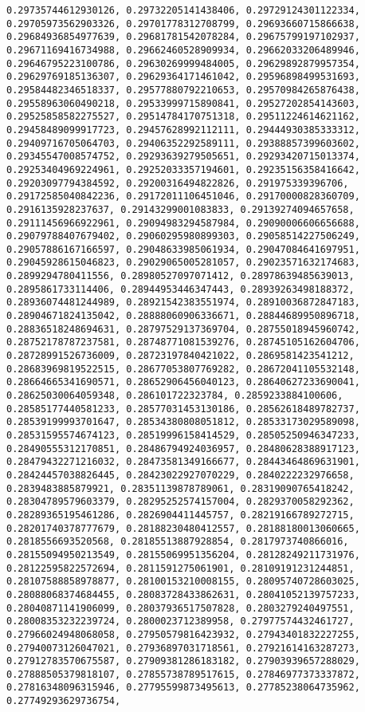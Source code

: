 \documentclass[11pt]{article}
\begin{document}
\begin{Verbatim}[commandchars=\\\{\}]
0.29735744612930126, 0.29732205141438406, 0.29729124301122334, 0.29705973562903326, 0.29701778312708799, 0.29693660715866638, 0.29684936854977639, 0.29681781542078284, 0.29675799197102937, 0.29671169416734988, 0.29662460528909934, 0.29662033206489946, 0.29646795223100786, 0.29630269999484005, 0.29629892879957354, 0.29629769185136307, 0.29629364171461042, 0.29596898499531693, 0.29584482346518337, 0.29577880792210653, 0.29570984265876438, 0.29558963060490218, 0.29533999715890841, 0.29527202854143603, 0.29525858582275527, 0.29514784170751318, 0.29511224614621162, 0.29458489099917723, 0.29457628992112111, 0.29444930385333312, 0.29409716705064703, 0.29406352292589111, 0.29388857399603602, 0.29345547008574752, 0.29293639279505651, 0.29293420715013374, 0.29253404969224961, 0.29252033357194601, 0.29235156358416642, 0.29203097794384592, 0.29200316494822826, 0.291975339396706, 0.29172585040842236, 0.29172011106451046, 0.29170000828360709, 0.2916135928237637, 0.29143299001083833, 0.29139274094657658, 0.29111456966922961, 0.29094983294587984, 0.29090006606656688, 0.29079788407679402, 0.29060295980899303, 0.29058514227506249, 0.29057886167166597, 0.29048633985061934, 0.29047084641697951, 0.29045928615046823, 0.29029065005281057, 0.29023571632174683, 0.2899294780411556, 0.28980527097071412, 0.28978639485639013, 0.2895861733114406, 0.28944953446347443, 0.28939263498188372, 0.28936074481244989, 0.28921542383551974, 0.28910036872847183, 0.28904671824135042, 0.28888060906336671, 0.28844689950896718, 0.28836518248694631, 0.28797529137369704, 0.28755018945960742, 0.28752178787237581, 0.28748771081539276, 0.28745105162604706, 0.28728991526736009, 0.28723197840421022, 0.2869581423541212, 0.28683969819522515, 0.28677053807769282, 0.28672041105532148, 0.28664665341690571, 0.28652906456040123, 0.28640627233690041, 0.28625030064059348, 0.286101722323784, 0.2859233884100606, 0.28585177440581233, 0.28577031453130186, 0.28562618489782737, 0.28539199993701647, 0.28534380808051812, 0.28533173029589098, 0.28531595574674123, 0.28519996158414529, 0.28505250946347233, 0.28490555312170851, 0.28486794924036957, 0.28480628388917123, 0.28479432271216032, 0.28473581349166677, 0.28443464869631901, 0.28424457038826445, 0.28423022927070229, 0.2840222232976658, 0.2839483885879921, 0.28351139878789061, 0.28319090765418242, 0.28304789579603379, 0.28295252574157004, 0.2829370058292362, 0.28289365195461286, 0.2826904411445757, 0.28219166789272715, 0.28201740378777679, 0.28188230480412557, 0.28188180013060665, 0.2818556693520568, 0.28185513887928854, 0.2817973740866016, 0.28155094950213549, 0.28155069951356204, 0.28128249211731976, 0.28122595822572694, 0.2811591275061901, 0.28109191231244851, 0.28107588858978877, 0.28100153210008155, 0.28095740728603025, 0.28088068374684455, 0.28083728433862631, 0.28041052139757233, 0.28040871141906099, 0.28037936517507828, 0.2803279240497551, 0.28008353232239724, 0.2800023712389958, 0.27977574432461727, 0.27966024948068058, 0.27950579816423932, 0.27943401832227255, 0.27940073126047021, 0.27936897031718561, 0.27921614163287273, 0.27912783570675587, 0.27909381286183182, 0.27903939657288029, 0.27888505379818107, 0.27855738789517615, 0.27846977373337872, 0.27816348096315946, 0.27795599873495613, 0.27785238064735962, 0.27749293629736754, 
\end{Verbatim}
\end{document}
